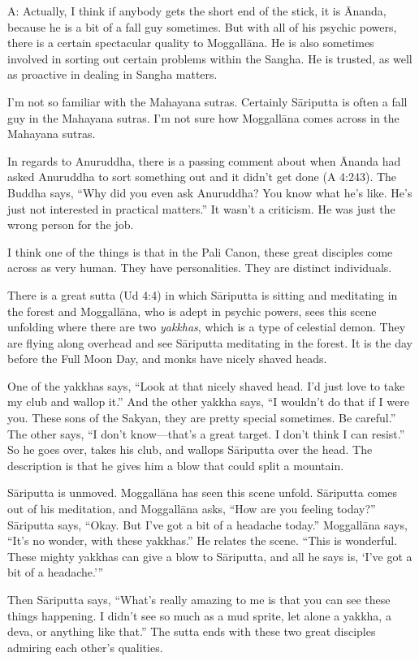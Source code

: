 \qaspace
A: Actually, I think if anybody gets the short end of the stick, it is
Ānanda, because he is a bit of a fall guy sometimes. But with all of his
psychic powers, there is a certain spectacular quality to Moggallāna. He
is also sometimes involved in sorting out certain problems within the
Sangha. He is trusted, as well as proactive in dealing in Sangha
matters.

I’m not so familiar with the Mahayana sutras. Certainly Sāriputta is
often a fall guy in the Mahayana sutras. I’m not sure how Moggallāna
comes across in the Mahayana sutras.

In regards to Anuruddha, there is a passing comment about when Ānanda
had asked Anuruddha to sort something out and it didn’t get done (A
4:243). The Buddha says, “Why did you even ask Anuruddha? You know what
he’s like. He’s just not interested in practical matters.” It wasn’t a
criticism. He was just the wrong person for the job.

I think one of the things is that in the Pali Canon, these great
disciples come across as very human. They have personalities. They are
distinct individuals.

There is a great sutta (Ud 4:4) in which Sāriputta is sitting and
meditating in the forest and Moggallāna, who is adept in psychic powers,
sees this scene unfolding where there are two \emph{yakkhas}, which is a
type of celestial demon. They are flying along overhead and see
Sāriputta meditating in the forest. It is the day before the Full Moon
Day, and monks have nicely shaved heads.

One of the yakkhas says, “Look at that nicely shaved head. I’d just love
to take my club and wallop it.” And the other yakkha says, “I wouldn’t
do that if I were you. These sons of the Sakyan, they are pretty special
sometimes. Be careful.” The other says, “I don’t know—that’s a great
target. I don’t think I can resist.” So he goes over, takes his club,
and wallops Sāriputta over the head. The description is that he gives
him a blow that could split a mountain.

Sāriputta is unmoved. Moggallāna has seen this scene unfold. Sāriputta
comes out of his meditation, and Moggallāna asks, “How are you feeling
today?” Sāriputta says, “Okay. But I’ve got a bit of a headache today.”
Moggallāna says, “It’s no wonder, with these yakkhas.” He relates the
scene. “This is wonderful. These mighty yakkhas can give a blow to
Sāriputta, and all he says is, ‘I’ve got a bit of a headache.’”

Then Sāriputta says, “What’s really amazing to me is that you can see
these things happening. I didn’t see so much as a mud sprite, let alone
a yakkha, a deva, or anything like that.” The sutta ends with these two
great disciples admiring each other’s qualities.

